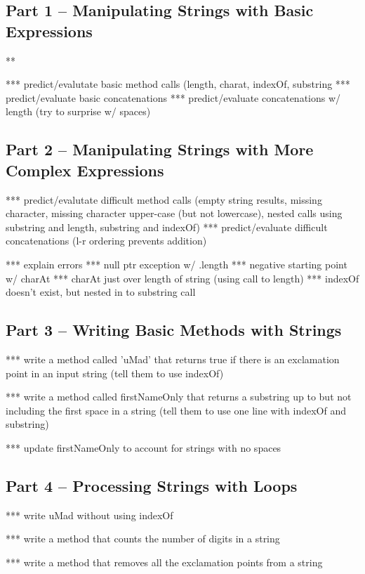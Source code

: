 \subsection{Part 1 -- Manipulating Strings with Basic Expressions}

\begin{eval}
\begin{sevalenum}
\item ***
\evalline
\end{sevalenum}
\end{eval}
*** predict/evalutate basic method calls (length, charat, indexOf, substring
*** predict/evaluate basic concatenations
*** predict/evaluate concatenations w/ length (try to surprise w/ spaces)



\subsection{Part 2 -- Manipulating Strings with More Complex Expressions}
*** predict/evalutate difficult method calls (empty string results, missing character, missing character upper-case (but not lowercase), nested calls using substring and length, substring and indexOf)
*** predict/evaluate difficult concatenations (l-r ordering prevents addition)

*** explain errors
	*** null ptr exception w/ .length
	*** negative starting point w/ charAt
	*** charAt just over length of string (using call to length)
	*** indexOf doesn't exist, but nested in to substring call


\initialbox

\subsection{Part 3 -- Writing Basic Methods with Strings}

*** write a method called 'uMad' that returns true if there is an exclamation point in an input string (tell them to use indexOf)

*** write a method called firstNameOnly that returns a substring up to but not including the first space in a string (tell them to use one line with indexOf and substring)

*** update firstNameOnly to account for strings with no spaces

\initialbox


\subsection{Part 4 -- Processing Strings with Loops}

*** write uMad without using indexOf

*** write a method that counts the number of digits in a string

*** write a method that removes all the exclamation points from a string

\initialbox

